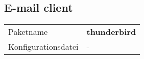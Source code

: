 \subsection{E-mail client}
\begin{tabular}{l|l}
Paketname & \textbf{thunderbird} \\ 
Konfigurationsdatei & - \\
\end{tabular}
